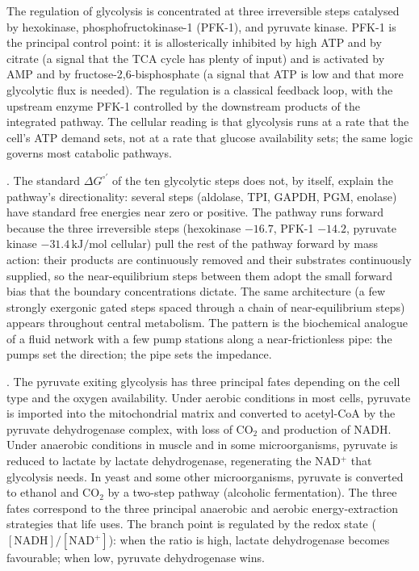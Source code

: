 

The regulation of glycolysis is concentrated at three irreversible
steps catalysed by hexokinase, phosphofructokinase-1 (PFK-1), and
pyruvate kinase. PFK-1 is the principal control point: it is
allosterically inhibited by high ATP and by citrate (a signal that the
TCA cycle has plenty of input) and is activated by AMP and by
fructose-2,6-bisphosphate (a signal that ATP is low and that more
glycolytic flux is needed). The regulation is a classical feedback
loop, with the upstream enzyme PFK-1 controlled by the downstream
products of the integrated pathway. The cellular reading is that
glycolysis runs at a rate that the cell's ATP demand sets, not at a
rate that glucose availability sets; the same logic governs most
catabolic pathways.

. The standard $\Delta
G^{\circ\prime}$ of the ten glycolytic steps does not, by itself,
explain the pathway's directionality: several steps (aldolase, TPI,
GAPDH, PGM, enolase) have standard free energies near zero or
positive. The pathway runs forward because the three irreversible
steps (hexokinase $-16.7$, PFK-1 $-14.2$, pyruvate kinase $-31.4\,
\text{kJ}/\text{mol}$ cellular) pull the rest of the pathway forward
by mass action: their products are continuously removed and their
substrates continuously supplied, so the near-equilibrium steps
between them adopt the small forward bias that the boundary
concentrations dictate. The same architecture (a few strongly
exergonic gated steps spaced through a chain of near-equilibrium
steps) appears throughout central metabolism. The pattern is the
biochemical analogue of a fluid network with a few pump stations
along a near-frictionless pipe: the pumps set the direction; the
pipe sets the impedance.

. The pyruvate exiting glycolysis has
three principal fates depending on the cell type and the oxygen
availability. Under aerobic conditions in most cells, pyruvate is
imported into the mitochondrial matrix and converted to acetyl-CoA
by the pyruvate dehydrogenase complex, with loss of CO$_2$ and
production of NADH. Under anaerobic conditions in muscle and in some
microorganisms, pyruvate is reduced to lactate by lactate
dehydrogenase, regenerating the NAD$^+$ that glycolysis needs. In
yeast and some other microorganisms, pyruvate is converted to
ethanol and CO$_2$ by a two-step pathway (alcoholic fermentation).
The three fates correspond to the three principal anaerobic and
aerobic energy-extraction strategies that life uses. The branch point
is regulated by the redox state ($[\text{NADH}]/[\text{NAD}^+]$): when
the ratio is high, lactate dehydrogenase becomes favourable; when low,
pyruvate dehydrogenase wins.

